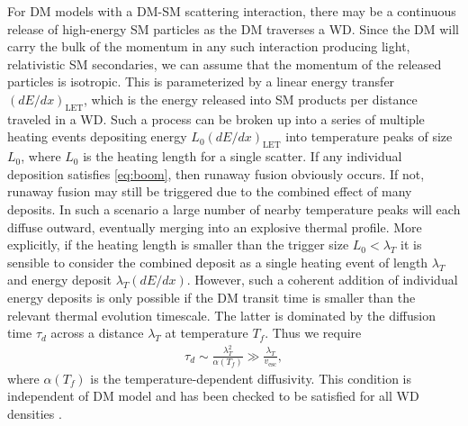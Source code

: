 \documentclass[twocolumn,preprintnumbers,amsmath,amssymb,prl, superscriptaddress]{revtex4}
\begin{document}
For DM models with a DM-SM scattering interaction, there may be a continuous release of high-energy SM particles as the DM traverses a WD.
Since the DM will carry the bulk of the momentum in any such interaction producing light, relativistic SM secondaries, we can assume that the momentum of the released particles is isotropic.
This is parameterized by a linear energy transfer $(dE/dx)_\text{LET}$, which is the energy released into SM products per distance traveled in a WD.
Such a process can be broken up into a series of multiple heating events depositing energy $L_0 (d E/d x)_\text{LET}$ into temperature peaks of size $L_0$, where $L_0$ is the heating length for a single scatter.
If any individual deposition satisfies \eqref{eq:boom}, then runaway fusion obviously occurs.
If not, runaway fusion may still be triggered due to the combined effect of many deposits.
In such a scenario a large number of nearby temperature peaks will each diffuse outward, eventually merging into an explosive thermal profile.
More explicitly, if the heating length is smaller than the trigger size $L_0 < \lambda_T$ it is sensible to consider the combined deposit as a single heating event of length $\lambda_T$ and energy deposit $\lambda_T (d E/d x)$.
However, such a coherent addition of individual energy deposits is only possible if the DM transit time is smaller than the relevant thermal evolution timescale.
The latter is dominated by the diffusion time $\tau_d$ across a distance $\lambda_T$ at temperature $T_f$.
Thus we require
\begin{align}
\tau_d \sim \frac{\lambda_T^2}{\alpha(T_f)} \gg \frac{\lambda_T}{v_\text{esc}},
\label{eq:SlowDiffusion}
\end{align}
where $\alpha(T_f)$ is the temperature-dependent diffusivity.
This condition is independent of DM model and has been checked to be satisfied for all WD densities \cite{Woosley}.
\end{document}
